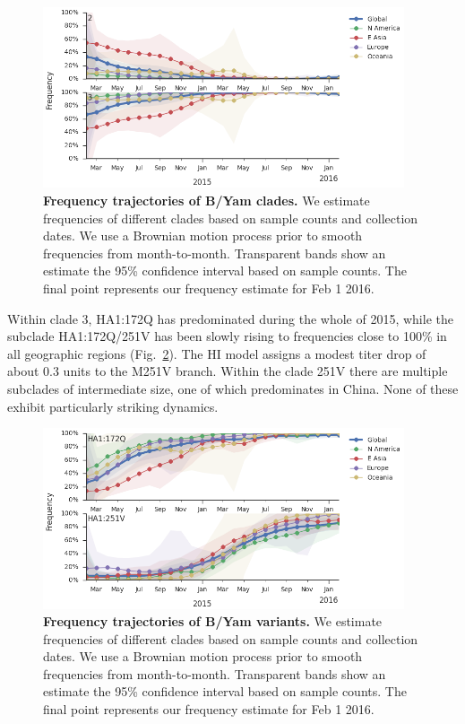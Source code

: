 \documentclass[11pt,oneside,letterpaper]{article}
\begin{document}
\begin{figure}[H]
	\centering		
	\includegraphics[width=0.95\textwidth]{../figures/feb-2016/Yam_clades.png}
	\caption{\textbf{Frequency trajectories of B/Yam clades.}
	We estimate frequencies of different clades based on sample counts and collection dates.
	We use a Brownian motion process prior to smooth frequencies from month-to-month.
	Transparent bands show an estimate the 95\% confidence interval based on sample counts.
	The final point represents our frequency estimate for Feb 1 2016.	
	}
	\label{Yam_clades}
\end{figure}

\pagebreak

Within clade 3, HA1:172Q has predominated during the whole of 2015, while the subclade HA1:172Q/251V has been slowly rising to frequencies close to 100\% in all geographic regions (Fig.\ \ref{Yam_mutations}). The HI model \cite{neher2015prediction} assigns a modest titer drop of about 0.3 units to the M251V branch. Within the clade 251V there are multiple subclades of intermediate size, one of which predominates in China. None of these exhibit particularly striking dynamics.

\begin{figure}[H]
	\centering		
	\includegraphics[width=0.95\textwidth]{../figures/feb-2016/Yam_mutations.png}
	\caption{\textbf{Frequency trajectories of B/Yam variants.}
	We estimate frequencies of different clades based on sample counts and collection dates.
	We use a Brownian motion process prior to smooth frequencies from month-to-month.
	Transparent bands show an estimate the 95\% confidence interval based on sample counts.
	The final point represents our frequency estimate for Feb 1 2016.	
	}
	\label{Yam_mutations}
\end{figure}



\end{document}
